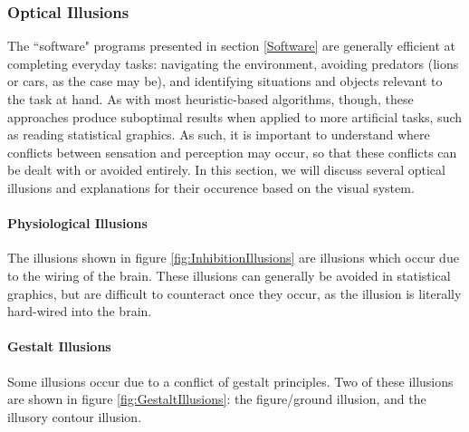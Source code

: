 \documentclass[11pt]{isuthesis}\usepackage[]{graphicx}\usepackage[]{color}
\begin{document}
\subsubsection{Optical Illusions}
The ``software" programs presented in section \ref{Software} are generally efficient at completing everyday tasks: navigating the environment, avoiding predators (lions or cars, as the case may be), and identifying situations and objects relevant to the task at hand. As with most heuristic-based algorithms, though, these approaches produce suboptimal results when applied to more artificial tasks, such as reading statistical graphics. As such, it is important to understand where conflicts between sensation and perception may occur, so that these conflicts can be dealt with or avoided entirely. In this section, we will discuss several optical illusions and explanations for their occurence based on the visual system.

\paragraph{Physiological Illusions} The illusions shown in figure \ref{fig:InhibitionIllusions} are illusions which occur due to the wiring of the brain. These illusions can generally be avoided in statistical graphics, but are difficult to counteract once they occur, as the illusion is literally hard-wired into the brain. 

\paragraph{Gestalt Illusions} Some illusions occur due to a conflict of gestalt principles. Two of these illusions are shown in figure \ref{fig:GestaltIllusions}: the figure/ground illusion, and the illusory contour illusion. 
\end{document}
